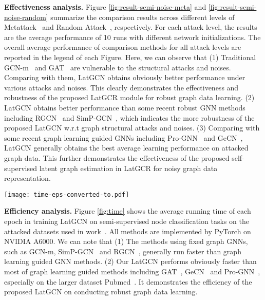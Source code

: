 \documentclass{article}
\begin{document}
\textbf{Effectiveness analysis.}
Figure \ref{fig:result-semi-noise-meta} and \ref{fig:result-semi-noise-random} summarize the comparison results across different levels of Metattack~\cite{mettack} and Random Attack~\cite{jin2020adversarial}, respectively. 
For each attack level, the results are the average performance of 10 runs with different network initializations. 
The overall average performance of comparison methods for all attack levels are reported in the legend of each Figure. 
Here, we can observe that
(1) Traditional GCN-m~\cite{kipf2016semi,graphsage} and GAT~\cite{velickovic2017graph} are vulnerable to the structural attacks and noises. Comparing with them, LatGCN obtains obviously better performance under various attacks and noises. This clearly demonstrates the effectiveness and robustness of the proposed LatGCR module for robust graph data learning.
(2) LatGCN obtains better performance than some recent robust GNN methods including RGCN~\cite{RGCN} and SimP-GCN~\cite{SimPGCN}, which indicates
the more robustness of the proposed LatGCN w.r.t graph structural attacks and noises.
(3) Comparing with some recent graph learning guided GNNs including Pro-GNN~\cite{prognn} and GeCN~\cite{GECN}, LatGCN generally obtains the best average learning performance on attacked graph data. This further demonstrates the effectiveness of the proposed self-supervised latent graph estimation in LatGCR for noisy graph data representation. 
\begin{figure*}[ht]
\centering
\texttt{[image: time-eps-converted-to.pdf]}
  \caption{The empirical average running time in each epoch of different methods.}\label{fig:time}
\end{figure*}


\textbf{Efficiency analysis.}
Figure \ref{fig:time} shows the average running time of each epoch in training LatGCN on semi-supervised node classification tasks on the attacked datasets used in work~\cite{prognn}. All methods are implemented by PyTorch on NVIDIA A6000.
We can note that
(1) The methods using fixed graph GNNs, such as GCN-m, SimP-GCN~\cite{SimPGCN} and RGCN~\cite{RGCN}, generally run faster than graph learning guided GNN methods.
(2) Our LatGCN performs obviously faster than most of graph learning guided methods including GAT~\cite{velickovic2017graph}, GeCN~\cite{GECN} and Pro-GNN~\cite{prognn}, especially on the larger dataset Pubmed~\cite{sen2008collective}.
It demonstrates the efficiency of the proposed LatGCN on conducting robust graph data learning.
\end{document}
